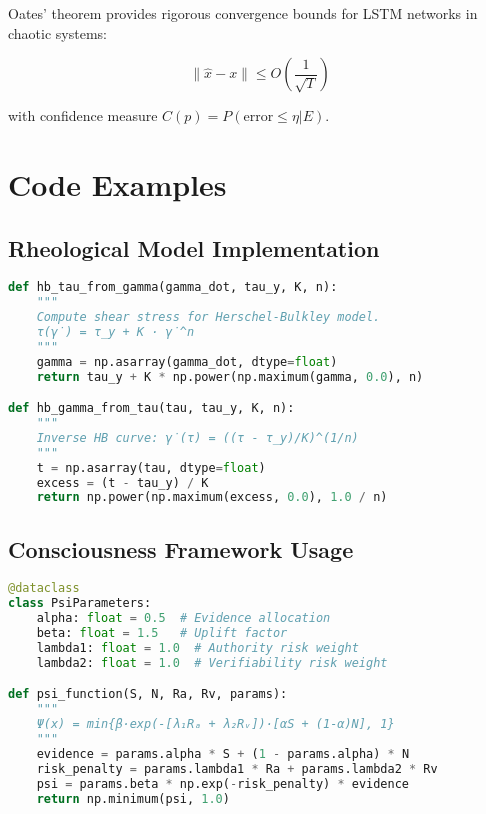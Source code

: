 \documentclass[11pt,a4paper]{article}
\begin{document}
Oates' theorem provides rigorous convergence bounds for LSTM networks in chaotic systems:

\begin{equation}
\|\hat{x} - x\| \leq O\left(\frac{1}{\sqrt{T}}\right)
\end{equation}

with confidence measure $C(p) = P(\text{error} \leq \eta | E)$.

\section{Code Examples}
\label{app:code}

\subsection{Rheological Model Implementation}

\begin{lstlisting}[language=Python, caption=HB Model Implementation]
def hb_tau_from_gamma(gamma_dot, tau_y, K, n):
    """
    Compute shear stress for Herschel-Bulkley model.
    τ(γ̇) = τ_y + K · γ̇^n
    """
    gamma = np.asarray(gamma_dot, dtype=float)
    return tau_y + K * np.power(np.maximum(gamma, 0.0), n)

def hb_gamma_from_tau(tau, tau_y, K, n):
    """
    Inverse HB curve: γ̇(τ) = ((τ - τ_y)/K)^(1/n)
    """
    t = np.asarray(tau, dtype=float)
    excess = (t - tau_y) / K
    return np.power(np.maximum(excess, 0.0), 1.0 / n)
\end{lstlisting}

\subsection{Consciousness Framework Usage}

\begin{lstlisting}[language=Python, caption=Consciousness Framework]
@dataclass
class PsiParameters:
    alpha: float = 0.5  # Evidence allocation
    beta: float = 1.5   # Uplift factor
    lambda1: float = 1.0  # Authority risk weight
    lambda2: float = 1.0  # Verifiability risk weight

def psi_function(S, N, Ra, Rv, params):
    """
    Ψ(x) = min{β·exp(-[λ₁Rₐ + λ₂Rᵥ])·[αS + (1-α)N], 1}
    """
    evidence = params.alpha * S + (1 - params.alpha) * N
    risk_penalty = params.lambda1 * Ra + params.lambda2 * Rv
    psi = params.beta * np.exp(-risk_penalty) * evidence
    return np.minimum(psi, 1.0)
\end{lstlisting}



\end{document}

